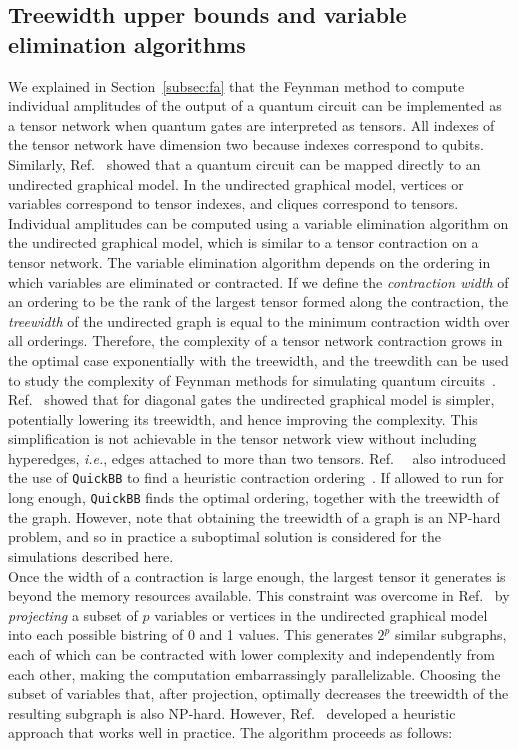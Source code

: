\subsection{Treewidth upper bounds and variable elimination algorithms}
\label{subsec:treewidth}
We explained in Section~\ref{subsec:fa} that the Feynman method to compute individual amplitudes of the output of a quantum circuit can be implemented as a tensor network when quantum gates are interpreted as tensors. All indexes of the tensor network have dimension two because indexes correspond to qubits.
Similarly, Ref.~\cite{Boi17} showed that a quantum circuit can be mapped directly to an undirected graphical model. In the undirected graphical model, vertices or variables correspond to tensor indexes, and cliques correspond to tensors. Individual amplitudes can be computed using a variable elimination algorithm on the undirected graphical model, which is similar to a tensor contraction on a tensor network. The variable elimination algorithm depends on the ordering in which variables are eliminated or contracted. If we define the \emph{contraction width} of an ordering to be the rank of the largest tensor formed along the contraction, the \emph{treewidth} of the undirected graph is equal to the minimum contraction width over all orderings. Therefore, the complexity of a tensor network contraction grows in the optimal case exponentially with the treewidth, and the treewdith can be used to study the complexity of Feynman methods for simulating quantum circuits~\cite{MS08}. Ref.~\cite{Boi17} showed that for diagonal gates the undirected graphical model is simpler, potentially lowering its treewidth, and hence improving the complexity. This simplification is not achievable in the tensor network view without including hyperedges, \emph{i.e.}, edges attached to more than two tensors. Ref.~~\cite{Boi17} also introduced the use of {\tt QuickBB} to find a heuristic contraction ordering~\cite{gogate2004complete}. If allowed to run for long enough, {\tt QuickBB} finds the optimal ordering, together with the treewidth of the graph. However, note that obtaining the treewidth of a graph is an NP-hard problem, and so in practice a suboptimal solution is considered for the simulations described here.\\

Once the width of a contraction is large enough, the largest tensor it generates is beyond the memory resources available. This constraint was overcome in Ref.~\cite{chen2018classical} by \emph{projecting} a subset of $p$ variables or vertices in the undirected graphical model into each possible bistring of 0 and 1 values. This generates $2^p$ similar subgraphs, each of which can be contracted with lower complexity and independently from each other, making the computation embarrassingly parallelizable. Choosing the subset of variables that, after projection, optimally decreases the treewidth of the resulting subgraph is also NP-hard. However, Ref.~\cite{chen2018classical} developed a heuristic approach that works well in practice. The algorithm proceeds as follows:

